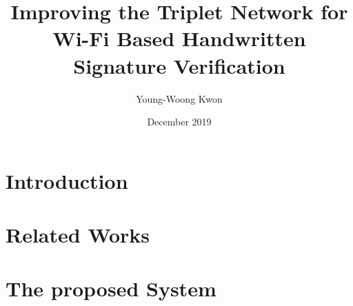 \documentclass[a4paper,11pt]{report}
\title{Improving the Triplet Network for Wi-Fi Based Handwritten Signature Verification}
\author{Young-Woong Kwon}
\date{December 2019}
\begin{document}
\makecover
\maketitle

\signaturepage

\pagestyle{plain}
\baselineskip 8.5mm
 \pagestyle{plain}
%
\setcounter{page}{0}
\tableofcontents
\listoffigures
{}
\listoftables
{}

\begin{abstract}

\end{abstract}

\newpage
{} %
\setcounter{page}{1}

\chapter{Introduction}\label{chapter:Introduction}

%

%

\chapter{Related Works}\label{chapter:Related Works}


%

\chapter{The proposed System}\label{chapter:The proposed System}

\end{document}
